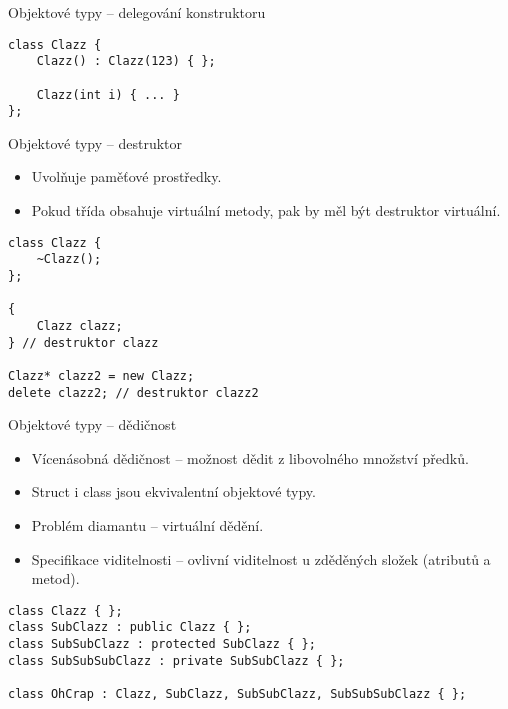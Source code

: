 \begin{frame}[fragile]
\begin{exampleblock}{Objektové typy -- delegování konstruktoru} 
\begin{lstlisting}
class Clazz {
	Clazz() : Clazz(123) { }; 
	
	Clazz(int i) { ... } 
};

\end{lstlisting}
\end{exampleblock}
\end{frame}


\begin{frame}[fragile]
\begin{block}{Objektové typy -- destruktor} 
\begin{itemize}
\item Uvolňuje paměťové prostředky.
\item
Pokud třída obsahuje virtuální metody, pak by měl být destruktor virtuální.
\end{itemize}
\end{block}
\begin{exampleblock}{}
\begin{lstlisting}
class Clazz {
	~Clazz();
};

{ 
	Clazz clazz;
} // destruktor clazz

Clazz* clazz2 = new Clazz; 
delete clazz2; // destruktor clazz2

\end{lstlisting}
\end{exampleblock}
\end{frame}


\begin{frame}[fragile]
\begin{block}{Objektové typy -- dědičnost} 
\begin{itemize}
\item Vícenásobná dědičnost -- možnost dědit z libovolného množství předků.
\item Struct i class jsou ekvivalentní objektové typy.
\item Problém diamantu -- virtuální dědění.
\item Specifikace viditelnosti -- ovlivní viditelnost u zděděných složek (atributů a metod).
\end{itemize}
\end{block}
\begin{exampleblock}{}
\begin{lstlisting}
class Clazz { };
class SubClazz : public Clazz { };
class SubSubClazz : protected SubClazz { };
class SubSubSubClazz : private SubSubClazz { };

class OhCrap : Clazz, SubClazz, SubSubClazz, SubSubSubClazz { };
\end{lstlisting}
\end{exampleblock}
\end{frame}

